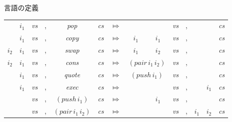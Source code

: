 \documentclass[cjk, 14pt]{beamer}
\begin{document}
\begin{frame}{言語の定義}

  \footnotesize
  \begin{tabular}{cccccccccccccc}
                             & $i_1$                    & \it{vs} & , & \it{pop}                        & \it{cs} & $\Mapsto$ &
                             &                          & \it{vs} & , &                &                & \it{cs} \\
                             & $i_1$                    & \it{vs} & , & \it{copy}                       & \it{cs} & $\Mapsto$ &
    $i_1$                    & $i_1$                    & \it{vs} & , &                &                & \it{cs} \\
    $i_2$                    & $i_1$                    & \it{vs} & , & \it{swap}                       & \it{cs} & $\Mapsto$ &
    $i_1$                    & $i_2$                    & \it{vs} & , &                &                & \it{cs} \\
    $i_2$                    & $i_1$                    & \it{vs} & , & \it{cons}                       & \it{cs} & $\Mapsto$ &
    \multicolumn{2}{c}{$(\mathit{pair} \, i_1 \, i_2)$} & \it{vs} & , &                &                & \it{cs} \\
                             & $i_1$                    & \it{vs} & , & \it{quote}                      & \it{cs} & $\Mapsto$ &
    \multicolumn{2}{c}{$(\mathit{push} \, i_1)$}        & \it{vs} & , &                &                & \it{cs} \\
                             & $i_1$                    & \it{vs} & , & \it{exec}                       & \it{cs} & $\Mapsto$ &
                             &                          & \it{vs} & , &                & $i_1$          & \it{cs} \\
                             &                          & \it{vs} & , & $(\mathit{push} \, i_1)$        & \it{cs} & $\Mapsto$ &
                             & $i_1$                    & \it{vs} & , &                &                & \it{cs} \\
                             &                          & \it{vs} & , & $(\mathit{pair} \, i_1 \, i_2)$ & \it{cs} & $\Mapsto$ &
                             &                          & \it{vs} & , & $i_1$          & $i_2$          & \it{cs} \\
  \end{tabular}

\end{frame}
\end{document}
